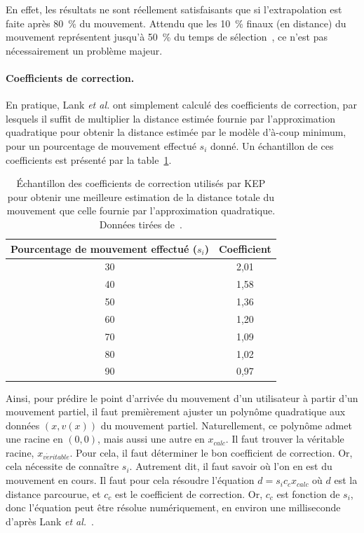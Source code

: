 	En effet, les résultats ne sont réellement satisfaisants que si l'extrapolation est faite après 80~\%{} du mouvement. Attendu que les 10~\%{} finaux (en distance) du mouvement représentent jusqu'à 50~\%{} du temps de sélection~\cite{mackenzie1987three, graham1996physical}, ce n'est pas nécessairement un problème majeur.
	
	\paragraph{Coefficients de correction.}
	En pratique, Lank \emph{et al.} ont simplement calculé des coefficients de correction, par lesquels il suffit de multiplier la distance estimée fournie par l'approximation quadratique pour obtenir la distance estimée par le modèle d'à-coup minimum, pour un pourcentage de mouvement effectué $s_{i}$ donné. Un échantillon de ces coefficients est présenté par la table~\ref{tab:kepCoeffs}.
	
	\begin{table}
	\centering
	\begin{tabular}{c c}
		Pourcentage de mouvement effectué ($s_{i}$)	& Coefficient	\bigstrut[b] \\ \hline
		30												& 2,01			\bigstrut[t] \\
		40												& 1,58			\\
		50												& 1,36			\\
		60												& 1,20			\\
		70												& 1,09			\\
		80												& 1,02			\\
		90												& 0,97			\\		
	\end{tabular}
	\caption[KEP -- coefficients de correction]{Échantillon des coefficients de correction utilisés par KEP pour obtenir une meilleure estimation de la distance totale du mouvement que celle fournie par l'approximation quadratique. Données tirées de~\cite{lank2007endpoint}.}
	\label{tab:kepCoeffs}
	\end{table}
	
	Ainsi, pour prédire le point d'arrivée du mouvement d'un utilisateur à partir d'un mouvement partiel, il faut premièrement ajuster un polynôme quadratique aux données $(x, v(x))$ du mouvement partiel. Naturellement, ce polynôme admet une racine en $(0,0)$, mais aussi une autre en $x_{calc}$. Il faut trouver la véritable racine, $x_{v\acute{e}ritable}$. Pour cela, il faut déterminer le bon coefficient de correction. Or, cela nécessite de connaître $s_{i}$. Autrement dit, il faut savoir où l'on en est du mouvement en cours. Il faut pour cela résoudre l'équation $d = s_{i}c_{c}x_{calc}$ où $d$ est la distance parcourue, et $c_{c}$ est le coefficient de correction. Or, $c_{c}$ est fonction de $s_{i}$, donc l'équation peut être résolue numériquement, en environ une milliseconde d'après Lank \emph{et al.}~\cite{lank2007endpoint}.
	
